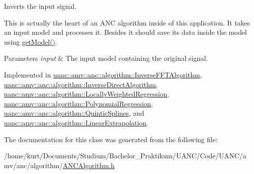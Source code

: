 Inverts the input signal. 

This is actually the heart of an A\+NC algorithm inside of this application. It takes an input model and processes it. Besides it should save its data inside the model using \hyperlink{classuanc_1_1amv_1_1anc_1_1algorithm_1_1_a_n_c_algorithm_a12ce80f6746cbb440cf771fc6878f7cf}{get\+Model()}.


\begin{DoxyParams}{Parameters}
{\em input} & The input model containing the original signal. \\
\hline
\end{DoxyParams}


Implemented in \hyperlink{classuanc_1_1amv_1_1anc_1_1algorithm_1_1_inverse_f_f_t_algorithm_a75d38b5ce03bca80a856dfa257f590a4}{uanc\+::amv\+::anc\+::algorithm\+::\+Inverse\+F\+F\+T\+Algorithm}, \hyperlink{classuanc_1_1amv_1_1anc_1_1algorithm_1_1_inverse_direct_algorithm_a4bd1bdcd128aee1f608be51660528954}{uanc\+::amv\+::anc\+::algorithm\+::\+Inverse\+Direct\+Algorithm}, \hyperlink{classuanc_1_1amv_1_1anc_1_1algorithm_1_1_locally_weighted_regression_aff29174e1b6f86e8a98ee9e9019b4e0d}{uanc\+::amv\+::anc\+::algorithm\+::\+Locally\+Weighted\+Regression}, \hyperlink{classuanc_1_1amv_1_1anc_1_1algorithm_1_1_polynomial_regression_a89422988308d10ec2871e92e3673c13d}{uanc\+::amv\+::anc\+::algorithm\+::\+Polynomial\+Regression}, \hyperlink{classuanc_1_1amv_1_1anc_1_1algorithm_1_1_quintic_splines_a8ca477544754bcf0e70a84ccc5b6e7d6}{uanc\+::amv\+::anc\+::algorithm\+::\+Quintic\+Splines}, and \hyperlink{classuanc_1_1amv_1_1anc_1_1algorithm_1_1_linear_extrapolation_aafb6717c9cb632241b10875630970388}{uanc\+::amv\+::anc\+::algorithm\+::\+Linear\+Extrapolation}.



The documentation for this class was generated from the following file\+:\begin{DoxyCompactItemize}
\item 
/home/kurt/\+Documents/\+Studium/\+Bachelor\+\_\+\+Praktikum/\+U\+A\+N\+C/\+Code/\+U\+A\+N\+C/amv/anc/algorithm/\hyperlink{_a_n_c_algorithm_8h}{A\+N\+C\+Algorithm.\+h}\end{DoxyCompactItemize}
